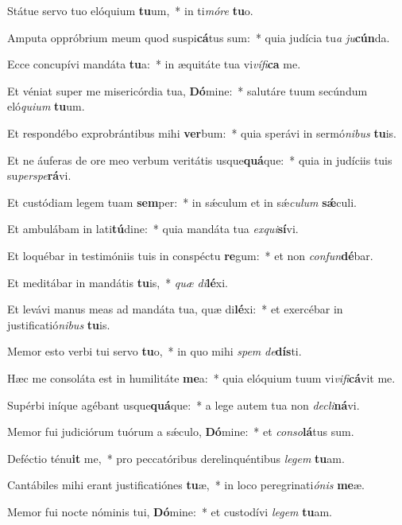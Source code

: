 \item Státue servo tuo elóquium \textbf{tu}um,~* in ti\textit{mó}\textit{re} \textbf{tu}o.
\item Amputa oppróbrium meum quod suspi\textbf{cá}tus sum:~* quia judícia tu\textit{a} \textit{ju}\textbf{cún}da.
\item Ecce concupívi mandáta \textbf{tu}a:~* in æquitáte tua vi\textit{ví}\textit{fi}\textbf{ca} me.
\item Et véniat super me misericórdia tua, \textbf{Dó}mine:~* salutáre tuum secúndum eló\textit{qui}\textit{um} \textbf{tu}um.
\item Et respondébo exprobrántibus mihi \textbf{ver}bum:~* quia sperávi in sermó\textit{ni}\textit{bus} \textbf{tu}is.
\item Et ne áuferas de ore meo verbum veritátis usque\textbf{quá}que:~* quia in judíciis tuis su\textit{per}\textit{spe}\textbf{rá}vi.
\item Et custódiam legem tuam \textbf{sem}per:~* in sǽculum et in sǽ\textit{cu}\textit{lum} \textbf{sǽ}culi.
\item Et ambulábam in lati\textbf{tú}dine:~* quia mandáta tua \textit{ex}\textit{qui}\textbf{sí}vi.
\item Et loquébar in testimóniis tuis in conspéctu \textbf{re}gum:~* et non \textit{con}\textit{fun}\textbf{dé}bar.
\item Et meditábar in mandátis \textbf{tu}is,~* \textit{quæ} \textit{di}\textbf{lé}xi.
\item Et levávi manus meas ad mandáta tua, quæ di\textbf{lé}xi:~* et exercébar in justificatió\textit{ni}\textit{bus} \textbf{tu}is.
\item Memor esto verbi tui servo \textbf{tu}o,~* in quo mihi \textit{spem} \textit{de}\textbf{dís}ti.
\item Hæc me consoláta est in humilitáte \textbf{me}a:~* quia elóquium tuum vi\textit{vi}\textit{fi}\textbf{cá}vit me.
\item Supérbi iníque agébant usque\textbf{quá}que:~* a lege autem tua non \textit{de}\textit{cli}\textbf{ná}vi.
\item Memor fui judiciórum tuórum a sǽculo, \textbf{Dó}mine:~* et \textit{con}\textit{so}\textbf{lá}tus sum.
\item Deféctio ténu\textbf{it} me,~* pro peccatóribus derelinquéntibus \textit{le}\textit{gem} \textbf{tu}am.
\item Cantábiles mihi erant justificatiónes \textbf{tu}æ,~* in loco peregrinati\textit{ó}\textit{nis} \textbf{me}æ.
\item Memor fui nocte nóminis tui, \textbf{Dó}mine:~* et custodívi \textit{le}\textit{gem} \textbf{tu}am.
